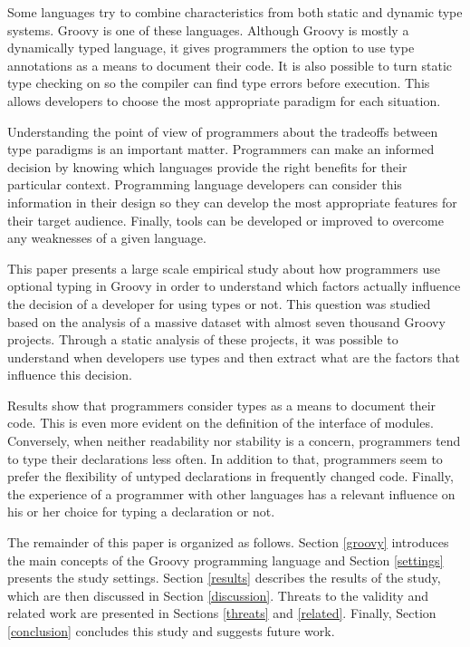 \documentclass[preprint]{sigplanconf}
\begin{document}
Some languages try to combine characteristics from both static and dynamic type systems.
Groovy \cite{groovy} is one of these languages.
Although Groovy is mostly a dynamically typed language, it gives programmers the option to use type annotations as a means to document their code.
It is also possible to turn static type checking on so the compiler can find type errors before execution.
This allows developers to choose the most appropriate paradigm for each situation.

Understanding the point of view of programmers about the tradeoffs between type paradigms is an important matter.
Programmers can make an informed decision by knowing which languages provide the right benefits for their particular context.
Programming language developers can consider this information in their design so they can develop the most appropriate features for their target audience.
Finally, tools can be developed or improved to overcome any weaknesses of a given language. 

This paper presents a large scale empirical study about how programmers use optional typing in Groovy in order to understand which factors actually influence the decision of a developer for using types or not. 
This question was studied based on the analysis of a massive dataset with almost seven thousand Groovy projects.
Through a static analysis of these projects, it was possible to understand when developers use types and then extract what are the factors that influence this decision.

Results show that programmers consider types as a means to document their code.
This is even more evident on the definition of the interface of modules.
Conversely, when neither readability nor stability is a concern, programmers tend to type their declarations less often.
In addition to that, programmers seem to prefer the flexibility of untyped declarations in frequently changed code.
Finally, the experience of a programmer with other languages has a relevant influence on his or her choice for typing a declaration or not.

The remainder of this paper is organized as follows. 
Section \ref{groovy} introduces the main concepts of the Groovy programming language and Section \ref{settings} presents the study settings.
Section \ref{results} describes the results of the study, which are then discussed in Section \ref{discussion}.
Threats to the validity and related work are presented in Sections \ref{threats} and \ref{related}.
Finally, Section \ref{conclusion} concludes this study and suggests future work.
\end{document}
